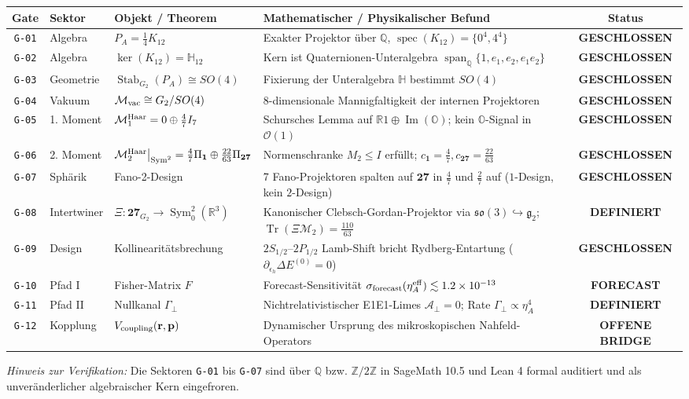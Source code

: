 \documentclass[11pt,a4paper]{article}
\newcommand{\statusClosed}{\textbf{\textcolor{closedGreen}{GESCHLOSSEN}}}
\newcommand{\statusDefined}{\textbf{\textcolor{definedBlue}{DEFINIERT}}}
\newcommand{\statusForecast}{\textbf{\textcolor{forecastOrange}{FORECAST}}}
\newcommand{\statusOpen}{\textbf{\textcolor{openRed}{OFFENE BRIDGE}}}
\begin{document}
\begin{table}[h!]
\centering
\small
\begin{tabularx}{\textwidth}{@{} c l l X c @{}}
\toprule
\textbf{Gate} & \textbf{Sektor} & \textbf{Objekt / Theorem} & \textbf{Mathematischer / Physikalischer Befund} & \textbf{Status} \\
\midrule
\texttt{G-01} & Algebra & $P_A = \frac{1}{4}K_{12}$ & Exakter Projektor über $\mathbb{Q}$, $\operatorname{spec}(K_{12}) = \{0^4, 4^4\}$ & \statusClosed \\
\texttt{G-02} & Algebra & $\ker(K_{12}) = \mathbb{H}_{12}$ & Kern ist Quaternionen-Unteralgebra $\operatorname{span}_{\mathbb{Q}}\{1, e_1, e_2, e_1e_2\}$ & \statusClosed \\
\texttt{G-03} & Geometrie & $\operatorname{Stab}_{G_2}(P_A) \cong SO(4)$ & Fixierung der Unteralgebra $\mathbb{H}$ bestimmt $SO(4)$ & \statusClosed \\
\texttt{G-04} & Vakuum & $\mathcal{M}_{\rm vac} \cong G_2/SO(4)$ & 8-dimensionale Mannigfaltigkeit der internen Projektoren & \statusClosed \\
\texttt{G-05} & 1. Moment & $\mathcal{M}_1^{\rm Haar} = 0 \oplus \frac{4}{7}I_7$ & Schursches Lemma auf $\mathbb{R}1 \oplus \operatorname{Im}(\mathbb{O})$; kein $\mathbb{O}$-Signal in $\mathcal{O}(1)$ & \statusClosed \\
\texttt{G-06} & 2. Moment & $\mathcal{M}_2^{\rm Haar}\big|_{\operatorname{Sym}^2} = \frac{4}{7}\Pi_{\mathbf{1}} \oplus \frac{22}{63}\Pi_{\mathbf{27}}$ & Normenschranke $M_2 \le I$ erfüllt; $c_{\mathbf{1}}=\frac{4}{7}, c_{\mathbf{27}}=\frac{22}{63}$ & \statusClosed \\
\texttt{G-07} & Sphärik & Fano-2-Design & 7 Fano-Projektoren spalten auf $\mathbf{27}$ in $\frac{4}{7}$ und $\frac{2}{7}$ auf ($1$-Design, kein $2$-Design) & \statusClosed \\
\texttt{G-08} & Intertwiner & $\Xi : \mathbf{27}_{G_2} \to \operatorname{Sym}_0^2(\mathbb{R}^3)$ & Kanonischer Clebsch-Gordan-Projektor via $\mathfrak{so}(3) \hookrightarrow \mathfrak{g}_2$; $\operatorname{Tr}(\Xi \mathcal{M}_2) = \frac{110}{63}$ & \statusDefined \\
\texttt{G-09} & Design & Kollinearitätsbrechung & $2S_{1/2}\text{--}2P_{1/2}$ Lamb-Shift bricht Rydberg-Entartung ($\partial_{\epsilon_h}\Delta E^{(0)}=0$) & \statusClosed \\
\texttt{G-10} & Pfad I & Fisher-Matrix $F$ & Forecast-Sensitivität $\sigma_{\rm forecast}(\eta_A^{\rm eff}) \lesssim 1.2 \times 10^{-13}$ & \statusForecast \\
\texttt{G-11} & Pfad II & Nullkanal $\Gamma_\perp$ & Nichtrelativistischer E1E1-Limes $\mathcal{A}_\perp=0$; Rate $\Gamma_\perp \propto \eta_A^4$ & \statusDefined \\
\texttt{G-12} & Kopplung & $V_{\rm coupling}(\mathbf{r}, \mathbf{p})$ & Dynamischer Ursprung des mikroskopischen Nahfeld-Operators & \statusOpen \\
\bottomrule
\end{tabularx}
\end{table}

\vfill
\noindent\footnotesize\textit{Hinweis zur Verifikation:} Die Sektoren \texttt{G-01} bis \texttt{G-07} sind über $\mathbb{Q}$ bzw. $\mathbb{Z}/2\mathbb{Z}$ in SageMath 10.5 und Lean 4 formal auditiert und als unveränderlicher algebraischer Kern eingefroren.
\end{document}
